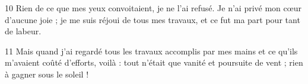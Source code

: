 
10 Rien de ce que mes yeux convoitaient, je ne l’ai refusé. Je n’ai privé mon cœur d’aucune joie ; je me suis réjoui de tous mes travaux, et ce fut ma part pour tant de labeur.

11 Mais quand j’ai regardé tous les travaux accomplis par mes mains et ce qu’ils m’avaient coûté d’efforts, voilà : tout n’était que vanité et poursuite de vent ; rien à gagner sous le soleil !